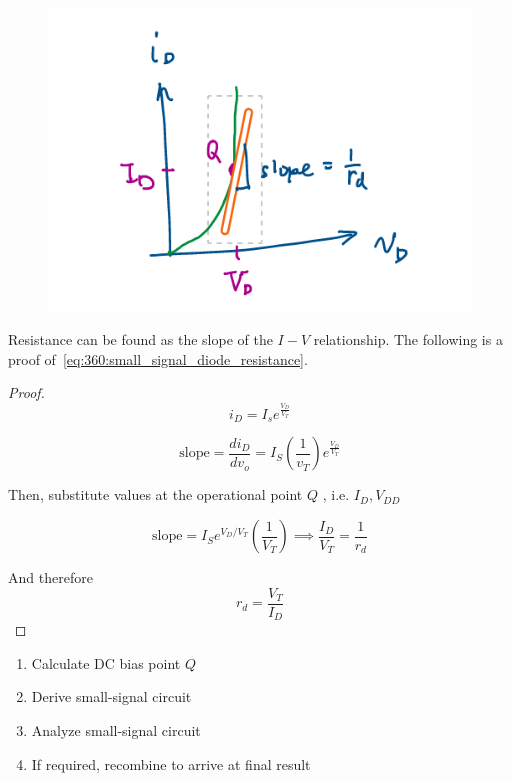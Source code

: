 \documentclass[../notes.tex]{subfiles}
\begin{document}
\begin{figure}[H]
	\centering
	\includegraphics[width=0.8\linewidth]{img/image_2022-09-20-13-28-41.png}
\end{figure}

Resistance can be found as the slope of the $ I-V $ relationship. 
The following is a proof of~\eqref{eq:360:small_signal_diode_resistance}.

\begin{proof}
\begin{equation}
	i_D = I_s e^{ \frac{V_D}{V_T} }
\end{equation}

\begin{equation}
	\text{slope} = \frac{di_D}{dv_o}  = I_S (\frac{1}{v_T}) e^{\frac{V_D}{V_T} }
\end{equation}

Then, substitute values at the operational point $ Q $ , i.e. $ I_D, V_{DD} $ 

\begin{equation}
	\text{slope} = I_S e^{V_D / V_T} (\frac{1}{V_T}) \implies \frac{I_D}{V_T} = \frac{1}{r_d}
\end{equation}

And therefore
\begin{equation}
	r_d = \frac{V_T}{I_D}
\end{equation}

\end{proof}


\begin{enumerate}
	\item Calculate DC bias point $ Q $ 
	\item Derive small-signal circuit
	\item Analyze small-signal circuit
	\item If required, recombine to arrive at final result
\end{enumerate}
\end{document}

